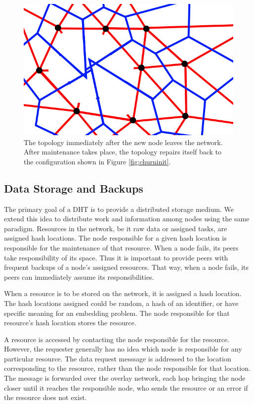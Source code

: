 \begin{figure}
	\includegraphics[width=\linewidth]{figs/voronoi-churn1}
	\caption{The topology immediately after the new node leaves the network. After maintenance takes place, the topology repairs itself back to the configuration shown in Figure \ref{fig:churninit}.}
	\label{fig:churndrop}
\end{figure}


\subsection{Data Storage and Backups}
The primary goal of a DHT is to provide a distributed storage medium. We extend this idea to distribute work and information among nodes using the same paradigm. Resources in the network, be it raw data or assigned tasks, are assigned hash locations. The node responsible for a given hash location is responsible for the maintenance of that resource. When a node fails, its peers take responsibility of its space. Thus it is important to provide peers with frequent backups of a node's assigned resources.  That way, when a node fails, its peers can immediately assume its responsibilities.

When a resource is to be stored on the network, it is assigned a hash location. The hash locations assigned could be random, a hash of an identifier, or have specific meaning for an embedding problem. The node responsible for that resource's hash location stores the resource.

A resource is accessed by contacting the node responsible for the resource.  However, the requester generally has no idea which node is responsible for any particular resource.  The data request messsage is addressed to the location corresponding to the resource, rather than the node responsible for that location.  The message is forwarded over the overlay network, each hop bringing the node closer until it reaches the responsible node, who sends the resource or an error if the resource does not exist.

